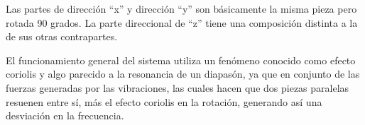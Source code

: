 Las partes de dirección  “x” y dirección “y” son básicamente la misma pieza pero rotada 90 grados. La parte direccional de “z” tiene una composición distinta a la de sus otras contrapartes.

El funcionamiento general del sistema utiliza un fenómeno conocido como efecto coriolis y algo parecido a la resonancia de un diapasón, ya que en conjunto de las fuerzas generadas por las vibraciones, las cuales hacen que dos piezas paralelas resuenen entre sí, más el efecto coriolis en la rotación, generando así una desviación en la frecuencia.


